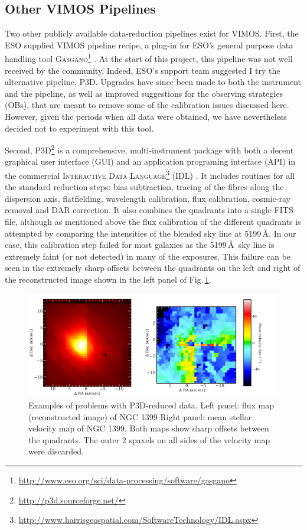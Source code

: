 	\subsection{Other VIMOS Pipelines}
		\label{subsec:Other}
		Two other publicly available data-reduction pipelines exist for VIMOS. First, the ESO supplied VIMOS pipeline recipe, a plug-in for ESO's general purpose data handling tool \textsc{Gasgano}\footnote{\url{http://www.eso.org/sci/data-processing/software/gasgano}} \citep{Izzo2004, ESO2012}. At the start of this project, this pipeline was not well received by the community. Indeed, ESO's support team suggested I try the alternative pipeline, \textsc{P3D}. Upgrades have since been made to both the instrument and the pipeline, as well as improved suggestions for the observing strategies (OBs), that are meant to remove some of the calibration issues discussed here. However, given the periods when all data were obtained, we have nevertheless decided not to experiment with this tool.
		
		Second, \textsc{P3D}\footnote{\url{http://p3d.sourceforge.net/}} is a comprehensive, multi-instrument package with both a decent graphical user interface (GUI) and an application programing interface (API) in the commercial \textsc{Interactive Data Language}\footnote{\url{http://www.harrisgeospatial.com/SoftwareTechnology/IDL.aspx}} (\textsc{IDL}) \citep{Sandin2010, Sandin2011}. It includes routines for all the standard reduction steps: bias subtraction, tracing of the fibres along the dispersion axis, flatfielding, wavelength calibration, flux calibration, cosmic-ray removal and DAR correction. It also combines the quadrants into a single FITS file, although as mentioned above the flux calibration of the different quadrants is attempted by comparing the intensities of the blended sky line at 5199\,\AA. In our case, this calibration step failed for most galaxies as the 5199\,\AA\ sky line is extremely faint (or not detected) in many of the exposures. This failure can be seen in the extremely sharp offsets between the quadrants on the left and right of the reconstructed image shown in the left panel of Fig.\,\ref{fig:P3D}. 

		\begin{figure}
			\centering
			\includegraphics[width=.9\textwidth]{chapter2/P3D_NGC1399.png}
			\caption[\textsc{P3D}-reduced data problems]{Examples of problems with \textsc{P3D}-reduced data. Left panel: flux map (reconstructed image) of NGC 1399 Right panel: mean stellar velocity map of NGC 1399. Both maps show sharp offsets between the quadrants. The outer 2 spaxels on all sides of the velocity map were discarded.}
			\label{fig:P3D}
		\end{figure}


